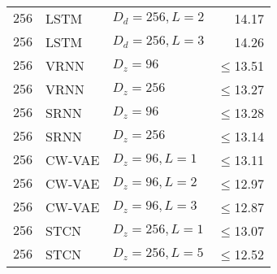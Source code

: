 {\begin{table}[p]
\begin{tabular}{lll|r}
        $256$     & LSTM                & $D_d=256, L=2$        & 14.17 \\
        $256$     & LSTM                & $D_d=256, L=3$        & 14.26 \\
        $256$     & VRNN                & $D_z=96$              & $\leq$13.51 \\
        $256$     & VRNN                & $D_z=256$             & $\leq$13.27 \\
        $256$     & SRNN                & $D_z=96$              & $\leq$13.28 \\
        $256$     & SRNN                & $D_z=256$             & $\leq$13.14 \\
        $256$     & CW-VAE              & $D_z=96, L=1$         & $\leq$13.11 \\
        $256$     & CW-VAE              & $D_z=96, L=2$         & $\leq$12.97 \\
        $256$     & CW-VAE              & $D_z=96, L=3$         & $\leq$12.87 \\
        $256$ & STCN              & $D_z=256,L=1$               & $\leq$13.07 \\  %
        $256$ & STCN              & $D_z=256,L=5$               & $\leq$12.52 \\
        \bottomrule
    \end{tabular}
    \label{tab: timit likelihoods dmol mu-law appendix}
\end{table}


}
